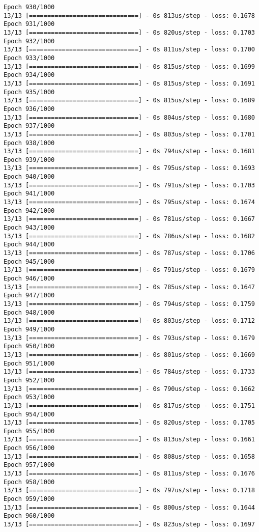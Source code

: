 \documentclass[11pt]{article}
\begin{document}
\begin{Verbatim}[commandchars=\\\{\}]
Epoch 930/1000
13/13 [==============================] - 0s 813us/step - loss: 0.1678
Epoch 931/1000
13/13 [==============================] - 0s 820us/step - loss: 0.1703
Epoch 932/1000
13/13 [==============================] - 0s 811us/step - loss: 0.1700
Epoch 933/1000
13/13 [==============================] - 0s 815us/step - loss: 0.1699
Epoch 934/1000
13/13 [==============================] - 0s 815us/step - loss: 0.1691
Epoch 935/1000
13/13 [==============================] - 0s 815us/step - loss: 0.1689
Epoch 936/1000
13/13 [==============================] - 0s 804us/step - loss: 0.1680
Epoch 937/1000
13/13 [==============================] - 0s 803us/step - loss: 0.1701
Epoch 938/1000
13/13 [==============================] - 0s 794us/step - loss: 0.1681
Epoch 939/1000
13/13 [==============================] - 0s 795us/step - loss: 0.1693
Epoch 940/1000
13/13 [==============================] - 0s 791us/step - loss: 0.1703
Epoch 941/1000
13/13 [==============================] - 0s 795us/step - loss: 0.1674
Epoch 942/1000
13/13 [==============================] - 0s 781us/step - loss: 0.1667
Epoch 943/1000
13/13 [==============================] - 0s 786us/step - loss: 0.1682
Epoch 944/1000
13/13 [==============================] - 0s 787us/step - loss: 0.1706
Epoch 945/1000
13/13 [==============================] - 0s 791us/step - loss: 0.1679
Epoch 946/1000
13/13 [==============================] - 0s 785us/step - loss: 0.1647
Epoch 947/1000
13/13 [==============================] - 0s 794us/step - loss: 0.1759
Epoch 948/1000
13/13 [==============================] - 0s 803us/step - loss: 0.1712
Epoch 949/1000
13/13 [==============================] - 0s 793us/step - loss: 0.1679
Epoch 950/1000
13/13 [==============================] - 0s 801us/step - loss: 0.1669
Epoch 951/1000
13/13 [==============================] - 0s 784us/step - loss: 0.1733
Epoch 952/1000
13/13 [==============================] - 0s 790us/step - loss: 0.1662
Epoch 953/1000
13/13 [==============================] - 0s 817us/step - loss: 0.1751
Epoch 954/1000
13/13 [==============================] - 0s 820us/step - loss: 0.1705
Epoch 955/1000
13/13 [==============================] - 0s 813us/step - loss: 0.1661
Epoch 956/1000
13/13 [==============================] - 0s 808us/step - loss: 0.1658
Epoch 957/1000
13/13 [==============================] - 0s 811us/step - loss: 0.1676
Epoch 958/1000
13/13 [==============================] - 0s 797us/step - loss: 0.1718
Epoch 959/1000
13/13 [==============================] - 0s 800us/step - loss: 0.1644
Epoch 960/1000
13/13 [==============================] - 0s 823us/step - loss: 0.1697

\end{Verbatim}
\end{document}
